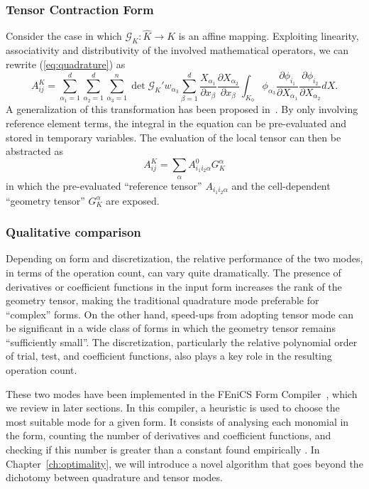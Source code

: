 \subsubsection{Tensor Contraction Form}
Consider the case in which $\mathcal{G}_K : \hat{K} \rightarrow K$ is an affine mapping. Exploiting linearity, associativity and distributivity of the involved mathematical operators, we can rewrite (\ref{eq:quadrature}) as
\begin{equation}
\label{eq:tensor}
A_{ij}^K = \sum_{\alpha_1=1}^d \sum_{\alpha_2=1}^d \sum_{\alpha_3=1}^n \operatorname{det} \mathcal{G}_K' w_{\alpha_3} \sum_{\beta=1}^d \frac{X_{\alpha_1}}{\partial x_{\beta}} \frac{\partial X_{\alpha_2}}{\partial x_{\beta}} \int_{K_0} \phi_{\alpha_3} \frac{\partial \phi_{i_1}}{\partial X_{\alpha_1}} \frac{\partial \phi_{i_2}}{\partial X_{\alpha_2}} dX.
\end{equation}
A generalization of this transformation has been proposed in~\cite{FFC-TC}. By only involving reference element terms, the integral in the equation can be pre-evaluated and stored in temporary variables. The evaluation of the local tensor can then be abstracted as
\begin{equation}
A_{ij}^K = \sum_{\alpha} A_{i_1 i_2 \alpha}^0 G_{K}^\alpha
\end{equation}
in which the pre-evaluated ``reference tensor'' $A_{i_1 i_2 \alpha}$ and the cell-dependent ``geometry tensor'' $G_{K}^\alpha$ are exposed. 


\subsubsection{Qualitative comparison}
Depending on form and discretization, the relative performance of the two modes, in terms of the operation count, can vary quite dramatically. The presence of derivatives or coefficient functions in the input form increases the rank of the geometry tensor, making the traditional quadrature mode preferable for ``complex'' forms. On the other hand, speed-ups from adopting tensor mode can be significant in a wide class of forms in which the geometry tensor remains ``sufficiently small''. The discretization, particularly the relative polynomial order of trial, test, and coefficient functions, also plays a key role in the resulting operation count. 

These two modes have been implemented in the FEniCS Form Compiler~\citep{FFC-TC}, which we review in later sections. In this compiler, a heuristic is used to choose the most suitable mode for a given form. It consists of analysing each monomial in the form, counting the number of derivatives and coefficient functions, and checking if this number is greater than a constant found empirically \citep{Fenics}. In Chapter~\ref{ch:optimality}, we will introduce a novel algorithm that goes beyond the dichotomy between quadrature and tensor modes.


